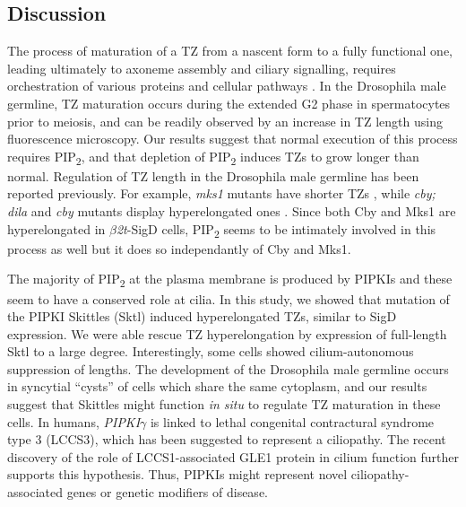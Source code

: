 \documentclass[12pt, twoside, letterpaper]{article}
\newcommand{\PIP}{PIP\textsubscript{2}}
\newcommand{\sigd}{$\beta$\textit{2t}-SigD}
\begin{document}
\begin{doublespacing}
\begin{linenumbers}
    \section{Discussion}
    The process of maturation of a TZ from a nascent form to a fully functional one,
    leading ultimately to axoneme assembly and ciliary signalling,
    requires orchestration of various proteins and cellular pathways
    \citep{reiter2012base}.
    In the Drosophila male germline, TZ maturation occurs during the
    extended G2 phase in spermatocytes prior to meiosis, and can be readily
    observed by an increase in TZ length using fluorescence microscopy.
    Our results suggest that normal execution of this process
    requires \PIP{}, and that depletion of \PIP{} induces TZs to
    grow longer than normal.
    Regulation of TZ length in the Drosophila male germline has been reported
    previously.
    For example, \textit{mks1} mutants have shorter TZs \citep{pratt2016drosophila},
    while
    \textit{cby; dila} and \textit{cby} mutants display hyperelongated ones
    \citep{enjolras2012drosophila,vieillard2016transition}.
    Since both Cby and Mks1 are hyperelongated in \sigd{} cells,
    \PIP{} seems to be intimately involved in this process as well but it does
    so independantly of Cby and Mks1.

    The majority of \PIP{} at the plasma membrane is produced by PIPKIs
    \citep{balla2013phosphoinositides}
    and these seem to have a conserved role at cilia.
    In this study, we showed that mutation of the PIPKI Skittles (Sktl)
    induced hyperelongated TZs, similar to SigD expression.
    We were able rescue TZ hyperelongation by expression of full-length Sktl to
    a large degree.
    Interestingly, some cells showed cilium-autonomous suppression of lengths.
    The development of the Drosophila male germline occurs in syncytial ``cysts''
    of cells which share the same cytoplasm, and
    our results suggest that Skittles might function \textit{in situ}
    to regulate TZ maturation in these cells.
    In humans, \textit{PIPKI$\gamma$} is linked to lethal congenital contractural
    syndrome type 3 (LCCS3), which has been suggested to represent a ciliopathy.
    The recent discovery of the role of LCCS1-associated GLE1 protein in cilium
    function \citep{jao2017role} further supports this hypothesis.
    Thus, PIPKIs might represent novel ciliopathy-associated genes
    or genetic modifiers of disease.
    

\end{linenumbers}
\end{doublespacing}
\end{document}
